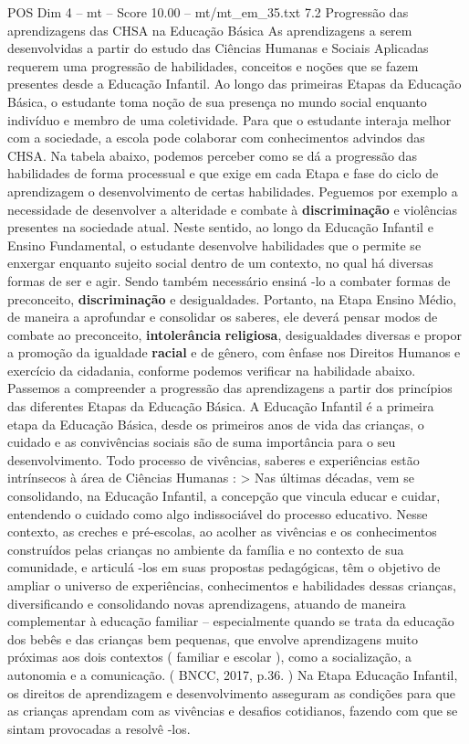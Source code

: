 \begin{textsample}{POS Dim 4 – mt – Score 10.00 – mt/mt\_em\_35.txt}  \label{ex:f4_pos_176}
7.2 Progressão das aprendizagens das CHSA na Educação Básica As aprendizagens a serem desenvolvidas a partir do estudo das Ciências Humanas e Sociais Aplicadas requerem uma progressão de habilidades, conceitos e noções que se fazem presentes desde a Educação Infantil.
Ao longo das primeiras Etapas da Educação Básica, o estudante toma noção de sua presença no mundo social enquanto indivíduo e membro de uma coletividade.
Para que o estudante interaja melhor com a sociedade, a escola pode colaborar com conhecimentos advindos das CHSA.
Na tabela abaixo, podemos perceber como se dá a progressão das habilidades de forma processual e que exige em cada Etapa e fase do ciclo de aprendizagem o desenvolvimento de certas habilidades.
Peguemos por exemplo a necessidade de desenvolver a alteridade e combate à \textbf{discriminação} e violências presentes na sociedade atual.
Neste sentido, ao longo da Educação Infantil e Ensino Fundamental, o estudante desenvolve habilidades que o permite se enxergar enquanto sujeito social dentro de um contexto, no qual há diversas formas de ser e agir.
Sendo também necessário ensiná -lo a combater formas de preconceito, \textbf{discriminação} e desigualdades.
Portanto, na Etapa Ensino Médio, de maneira a aprofundar e consolidar os saberes, ele deverá pensar modos de combate ao preconceito, \textbf{intolerância} \textbf{religiosa}, desigualdades diversas e propor a promoção da igualdade \textbf{racial} e de gênero, com ênfase nos Direitos Humanos e exercício da cidadania, conforme podemos verificar na habilidade abaixo.
Passemos a compreender a progressão das aprendizagens a partir dos princípios das diferentes Etapas da Educação Básica.
A Educação Infantil é a primeira etapa da Educação Básica, desde os primeiros anos de vida das crianças, o cuidado e as convivências sociais são de suma importância para o seu desenvolvimento.
Todo processo de vivências, saberes e experiências estão intrínsecos à área de Ciências Humanas : > Nas últimas décadas, vem se consolidando, na Educação Infantil, a concepção que vincula educar e cuidar, entendendo o cuidado como algo indissociável do processo educativo.
Nesse contexto, as creches e pré-escolas, ao acolher as vivências e os conhecimentos construídos pelas crianças no ambiente da família e no contexto de sua comunidade, e articulá -los em suas propostas pedagógicas, têm o objetivo de ampliar o universo de experiências, conhecimentos e habilidades dessas crianças, diversificando e consolidando novas aprendizagens, atuando de maneira complementar à educação familiar – especialmente quando se trata da educação dos bebês e das crianças bem pequenas, que envolve aprendizagens muito próximas aos dois contextos ( familiar e escolar ), como a socialização, a autonomia e a comunicação. ( BNCC, 2017, p.36. ) Na Etapa Educação Infantil, os direitos de aprendizagem e desenvolvimento asseguram as condições para que as crianças aprendam com as vivências e desafios cotidianos, fazendo com que se sintam provocadas a resolvê -los.

\end{textsample}
